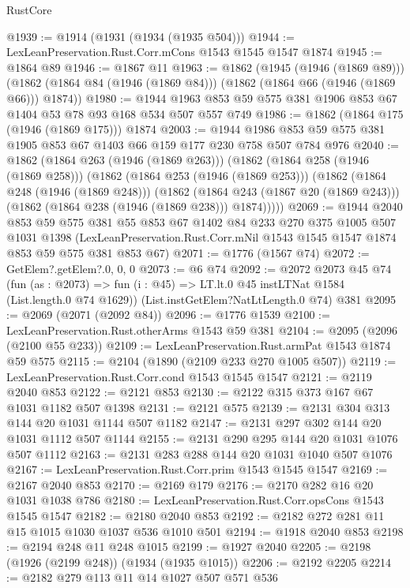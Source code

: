 \begin{lexlean}{RustCore}
\begin{coremodule}
@1939 := @1914 (@1931 (@1934 (@1935 @504)))
@1944 := LexLeanPreservation.Rust.Corr.mCons @1543 @1545 @1547 @1874
@1945 := @1864 @89
@1946 := @1867 @11
@1963 := @1862
    (@1945 (@1946 (@1869 @89)))
    (@1862 (@1864 @84 (@1946 (@1869 @84))) (@1862 (@1864 @66 (@1946 (@1869 @66))) @1874))
@1980 := @1944 @1963 @853 @59 @575 @381 @1906 @853 @67 @1404 @53 @78 @93 @168 @534 @507 @557 @749
@1986 := @1862 (@1864 @175 (@1946 (@1869 @175))) @1874
@2003 := @1944 @1986 @853 @59 @575 @381 @1905 @853 @67 @1403 @66 @159 @177 @230 @758 @507 @784 @976
@2040 := @1862
    (@1864 @263 (@1946 (@1869 @263)))
    (@1862
      (@1864 @258 (@1946 (@1869 @258)))
      (@1862
        (@1864 @253 (@1946 (@1869 @253)))
        (@1862
          (@1864 @248 (@1946 (@1869 @248)))
          (@1862
            (@1864 @243 (@1867 @20 (@1869 @243)))
            (@1862 (@1864 @238 (@1946 (@1869 @238))) @1874)))))
@2069 := @1944
    @2040
    @853
    @59
    @575
    @381
    @55
    @853
    @67
    @1402
    @84
    @233
    @270
    @375
    @1005
    @507
    @1031
    @1398
    (LexLeanPreservation.Rust.Corr.mNil @1543 @1545 @1547 @1874 @853 @59 @575 @381 @853 @67)
@2071 := @1776 (@1567 @74)
@2072 := GetElem?.getElem?.{0, 0, 0}
@2073 := @6 @74
@2092 := @2072
    @2073
    @45
    @74
    (fun (as : @2073) => fun (i : @45) => LT.lt.{0} @45 instLTNat @1584 (List.length.{0} @74 @1629))
    (List.instGetElem?NatLtLength.{0} @74)
    @381
@2095 := @2069 (@2071 (@2092 @84))
@2096 := @1776 @1539
@2100 := LexLeanPreservation.Rust.otherArms @1543 @59 @381
@2104 := @2095 (@2096 (@2100 @55 @233))
@2109 := LexLeanPreservation.Rust.armPat @1543 @1874 @59 @575
@2115 := @2104 (@1890 (@2109 @233 @270 @1005 @507))
@2119 := LexLeanPreservation.Rust.Corr.cond @1543 @1545 @1547
@2121 := @2119 @2040 @853
@2122 := @2121 @853
@2130 := @2122 @315 @373 @167 @67 @1031 @1182 @507 @1398
@2131 := @2121 @575
@2139 := @2131 @304 @313 @144 @20 @1031 @1144 @507 @1182
@2147 := @2131 @297 @302 @144 @20 @1031 @1112 @507 @1144
@2155 := @2131 @290 @295 @144 @20 @1031 @1076 @507 @1112
@2163 := @2131 @283 @288 @144 @20 @1031 @1040 @507 @1076
@2167 := LexLeanPreservation.Rust.Corr.prim @1543 @1545 @1547
@2169 := @2167 @2040 @853
@2170 := @2169 @179
@2176 := @2170 @282 @16 @20 @1031 @1038 @786
@2180 := LexLeanPreservation.Rust.Corr.opsCons @1543 @1545 @1547
@2182 := @2180 @2040 @853
@2192 := @2182 @272 @281 @11 @15 @1015 @1030 @1037 @536 @1010 @501
@2194 := @1918 @2040 @853
@2198 := @2194 @248 @11 @248 @1015
@2199 := @1927 @2040
@2205 := @2198 (@1926 (@2199 @248)) (@1934 (@1935 @1015))
@2206 := @2192 @2205
@2214 := @2182 @279 @113 @11 @14 @1027 @507 @571 @536

\end{coremodule}
\end{lexlean}
